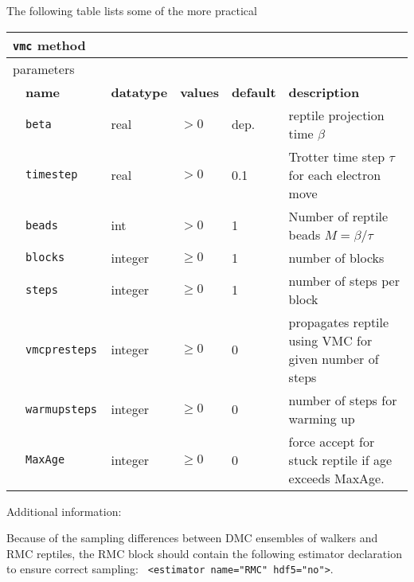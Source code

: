 The following table lists some of the more practical 
\begin{table}[h]
\begin{center}
\begin{tabularx}{\textwidth}{l l l l l l }
\hline
\multicolumn{6}{l}{\texttt{vmc} method} \\
\hline
\multicolumn{2}{l}{parameters}  & \multicolumn{4}{l}{}\\
   &   \bfseries name     & \bfseries datatype & \bfseries values & \bfseries default   & \bfseries description \\
   &   \texttt{beta            } &  real  & $> 0$ & dep.   & reptile projection time $\beta$  \\
   &   \texttt{timestep            } &  real     & $> 0$ & 0.1 & Trotter time step $\tau$ for each electron move \\
   &   \texttt{beads           } &  int     & $> 0$ & 1 & Number of reptile beads $M=\beta/\tau$ \\
   &   \texttt{blocks              } &  integer  & $\ge 0$ & 1   & number of blocks            \\
   &   \texttt{steps               } &  integer  & $\ge 0$ & 1   & number of steps per block   \\
   &   \texttt{vmcpresteps        } &  integer  & $\ge 0$ & 0   & propagates reptile using VMC for given number of steps\\
   &   \texttt{warmupsteps         } &  integer  & $\ge 0$ & 0   & number of steps for warming up\\
   &   \texttt{MaxAge              }   & integer & $\ge 0 $   & 0   & force accept for stuck reptile if age exceeds MaxAge. \\
  \hline
\end{tabularx}
\end{center}
\end{table}

Additional information:

Because of the sampling differences between DMC ensembles of walkers and RMC reptiles, the RMC block should contain the following estimator declaration to ensure correct sampling:  \texttt{ <estimator name="RMC" hdf5="no">}. 
  
